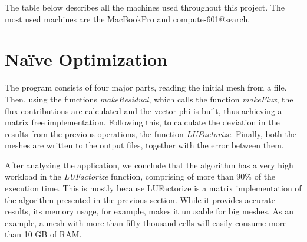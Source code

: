 \documentclass[a4paper,10pt,openright,openbib,twocolumn]{article}
\begin{document}
The table below describes all the machines used throughout this project. The most used machines are the MacBookPro and compute-601@search.

\begin{center}

            \begin{table}[!htb]
            \caption{Test machines}         
            \end{table}
        \end{center}

\section{Na\"{i}ve Optimization}
\label{naive}

The program consists of four major parts, reading the initial mesh from a file. Then, using the functions \emph{makeResidual}, which calls the function \emph{makeFlux}, the flux contributions are calculated and the vector phi is built, thus achieving a matrix free implementation. Following this, to calculate the deviation in the results from the previous operations, the function \emph{LUFactorize}. Finally, both the meshes are written to the output files, together with the error between them.
 
After analyzing the application, we conclude that the algorithm has a very high workload in the \emph{LUFactorize} function, comprising of more than 90\% of the execution time.
This is mostly because LUFactorize is a matrix implementation of the algorithm presented in the previous section. While it provides accurate results, its memory usage, for example, makes it unusable for big meshes. As an example, a mesh with more than fifty thousand cells will easily consume more than 10 GB of RAM.
\end{document}
